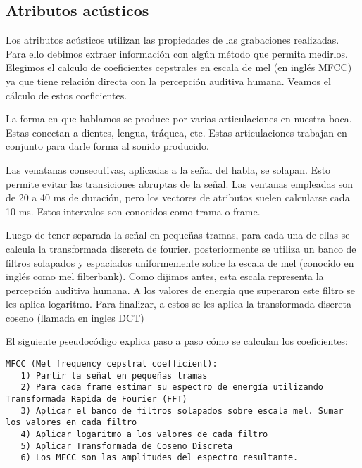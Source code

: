 \subsection{Atributos acústicos}

Los atributos acústicos utilizan las propiedades de las grabaciones realizadas. Para ello debimos extraer información con algún método que permita medirlos. Elegimos el calculo de coeficientes cepstrales en escala de mel (en inglés MFCC) ya que tiene relación directa con la percepción auditiva humana. Veamos el cálculo de estos coeficientes.

La forma en que hablamos se produce por varias articulaciones en nuestra boca. Estas conectan a dientes, lengua, tráquea, etc. Estas articulaciones trabajan en conjunto para darle forma al sonido producido. 



Las venatanas consecutivas, aplicadas a la señal del habla, se solapan. Esto permite evitar las transiciones abruptas de la señal. Las ventanas empleadas son de 20 a 40 ms de duración, pero los vectores de atributos suelen calcularse cada 10 ms. Estos intervalos son conocidos como trama o frame.

Luego de tener separada la señal en pequeñas tramas, para cada una de ellas se calcula la transformada discreta de fourier. posteriormente se utiliza un banco de filtros solapados y espaciados uniformemente sobre la escala de mel (conocido en inglés como mel filterbank). Como dijimos antes, esta escala representa la percepción auditiva humana. A los valores de energía que superaron este filtro se les aplica logaritmo. Para finalizar, a estos se les aplica la transformada discreta coseno (llamada en ingles DCT)

El siguiente pseudocódigo explica paso a paso cómo se calculan los coeficientes:
\begin{lstlisting}[numbers=none, keywordstyle=\ttfamily]
   MFCC (Mel frequency cepstral coefficient):
   1) Partir la señal en pequeñas tramas 
   2) Para cada frame estimar su espectro de energía utilizando Transformada Rapida de Fourier (FFT)
   3) Aplicar el banco de filtros solapados sobre escala mel. Sumar los valores en cada filtro
   4) Aplicar logaritmo a los valores de cada filtro
   5) Aplicar Transformada de Coseno Discreta
   6) Los MFCC son las amplitudes del espectro resultante.
\end{lstlisting}

